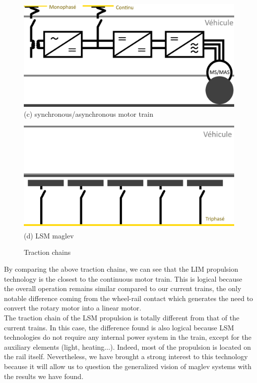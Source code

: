 \documentclass[12pt, a4paper, onecolumn]{article}
\renewcommand{\tab}{\tabto{15px}}
\begin{document}
\begin{figure}[H]
  \begin{minipage}[H]{0.47\textwidth}
    \includegraphics[width=\textwidth]{img/CTAtrain.png}
    \;(c) synchronous/asynchronous motor train
  \end{minipage}
  \hfill
  \begin{minipage}[H]{0.47\textwidth}
    \includegraphics[width=\textwidth]{img/CTALSM.png}
    \;(d) LSM maglev
  \end{minipage}
  \caption{Traction chains}
\end{figure}

\tab By comparing the above traction chains, we can see that the LIM propulsion technology is the closest to the continuous motor train.
This is logical because the overall operation remains similar compared to our current trains, the only notable difference coming from the wheel-rail contact which generates the need to convert the rotary motor into a linear motor. \\
\linebreak
\tab The traction chain of the LSM propulsion is totally different from that of the current trains.
In this case, the difference found is also logical because LSM technologies do not require any internal power system in the train, except for the auxiliary elements (light, heating...).
Indeed, most of the propulsion is located on the rail itself.
Nevertheless, we have brought a strong interest to this technology because it will allow us to question the generalized vision of maglev systems with the results we have found.\\
\end{document}

